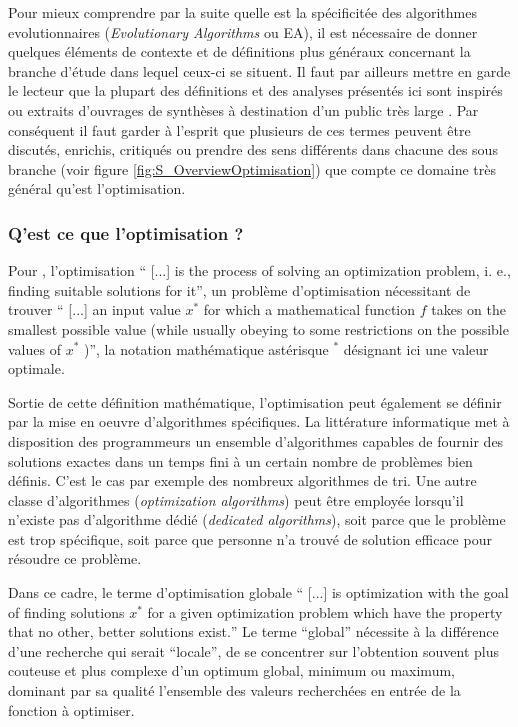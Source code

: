 Pour mieux comprendre par la suite quelle est la spécificitée des algorithmes evolutionnaires (\textit{Evolutionary Algorithms} ou EA), il est nécessaire de donner quelques éléments de contexte et de définitions plus généraux concernant la branche d'étude dans lequel ceux-ci se situent. Il faut par ailleurs mettre en garde le lecteur que la plupart des définitions et des analyses présentés ici sont inspirés ou extraits d'ouvrages de synthèses à destination d'un public très large \autocites{Weise2011, Luke2013, Brownlee2012}. Par conséquent il faut garder à l'esprit que plusieurs de ces termes peuvent être discutés, enrichis, critiqués ou prendre des sens différents dans chacune des sous branche (voir figure \ref{fig:S_OverviewOptimisation}) que compte ce domaine très général qu'est l'optimisation.

\subsubsection{Q'est ce que l'optimisation ?}
\label{sssec:Optimisation}

Pour \textcite[22]{Weise2011}, l'optimisation \foreignquote{english}{ [...] is the process of solving an optimization problem, i. e., finding suitable solutions for it}, un problème d'optimisation nécessitant de trouver \foreignquote{english}{ [...] an input value $x^*$ for which a mathematical function $f$ takes on the smallest possible value (while usually obeying to some restrictions on the possible values of $x^*$ )}, la notation mathématique astérisque $^*$ désignant ici une valeur optimale.

Sortie de cette définition mathématique, l'optimisation peut également se définir par la mise en oeuvre d'algorithmes spécifiques. La littérature informatique met à disposition des programmeurs un ensemble d'algorithmes capables de fournir des solutions exactes dans un temps fini à un certain nombre de problèmes bien définis. C'est le cas par exemple des nombreux algorithmes de tri. Une autre classe d'algorithmes (\textit{optimization algorithms}) peut être employée lorsqu'il n'existe pas d'algorithme dédié (\textit{dedicated algorithms}), soit parce que le problème est trop spécifique, soit parce que personne n'a trouvé de solution efficace pour résoudre ce problème.

Dans ce cadre, le terme d'optimisation globale \foreignquote{english}{ [...] is optimization with the goal of finding solutions $x^*$ for a given optimization problem which have the property that no other, better solutions exist.} Le terme \enquote{global} nécessite à la différence d'une recherche qui serait \enquote{locale}, de se concentrer sur l'obtention souvent plus couteuse et plus complexe d'un optimum global, minimum ou maximum, dominant par sa qualité l'ensemble des valeurs recherchées en entrée de la fonction à optimiser.

